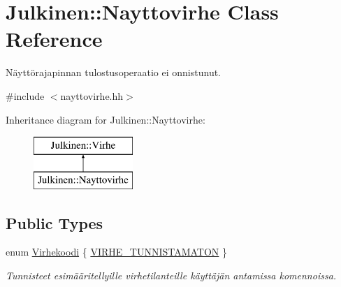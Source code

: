 \hypertarget{class_julkinen_1_1_nayttovirhe}{}\section{Julkinen\+:\+:Nayttovirhe Class Reference}
\label{class_julkinen_1_1_nayttovirhe}


Näyttörajapinnan tulostusoperaatio ei onnistunut.  




{\ttfamily \#include $<$nayttovirhe.\+hh$>$}

Inheritance diagram for Julkinen\+:\+:Nayttovirhe\+:\begin{figure}[H]
\begin{center}
\leavevmode
\includegraphics[height=2.000000cm]{class_julkinen_1_1_nayttovirhe}
\end{center}
\end{figure}
\subsection*{Public Types}
\begin{DoxyCompactItemize}
\item 
enum \hyperlink{class_julkinen_1_1_nayttovirhe_a13d43d49006dab024b0d3ac20a9fb8fa}{Virhekoodi} \{ \hyperlink{class_julkinen_1_1_nayttovirhe_a13d43d49006dab024b0d3ac20a9fb8faa26e7e527083430befdfdcd45f270514b}{V\+I\+R\+H\+E\+\_\+\+T\+U\+N\+N\+I\+S\+T\+A\+M\+A\+T\+O\+N}
 \}\begin{DoxyCompactList}\small\item\em Tunnisteet esimääritellyille virhetilanteille käyttäjän antamissa komennoissa. \end{DoxyCompactList}
\end{DoxyCompactItemize}
